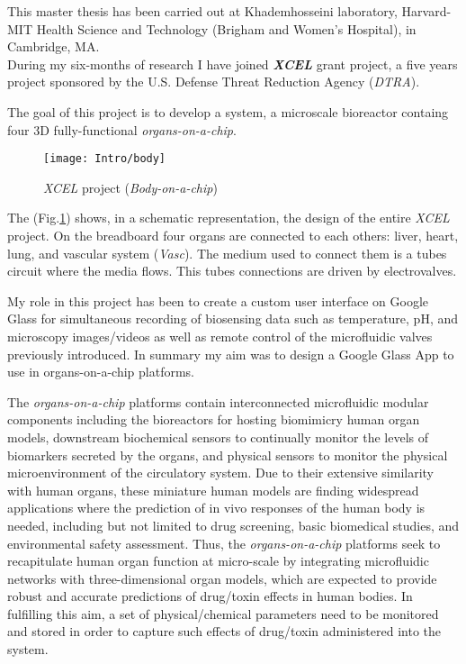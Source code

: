 This master thesis has been carried out at Khademhosseini laboratory, Harvard-MIT Health Science and Technology (Brigham and Women's Hospital), in Cambridge, MA.\\
During my six-months of research I have joined \textit{\textbf{XCEL}} grant project, a five years project sponsored by the U.S. Defense Threat Reduction Agency (\textit{DTRA}).

The goal of this project is to develop a system, a microscale bioreactor containg four 3D fully-functional \textit{organs-on-a-chip}.

\begin{figure}[h]
	\centering
	\texttt{[image: Intro/body]}
	\caption{\textit{XCEL} project (\textit{Body-on-a-chip})}
	\label{Fig:Body}
	
\end{figure}

The (Fig.\ref{Fig:Body}) shows, in a schematic representation, the design of the entire \textit{XCEL} project. On the breadboard four organs are connected to each others: liver, heart, lung, and vascular system (\textit{Vasc}). The medium used to connect them is a tubes circuit where the media flows. This tubes connections are driven by electrovalves.


My role in this project has been to create a custom user interface on Google Glass for simultaneous recording of biosensing data such as temperature, pH, and microscopy images/videos as well as remote control of the microfluidic valves previously introduced. In summary my aim was to design a Google Glass App to use in organs-on-a-chip platforms.

The \textit{organs-on-a-chip} platforms contain interconnected microfluidic modular components including the bioreactors for hosting biomimicry human organ models, downstream biochemical sensors to continually monitor the levels of biomarkers secreted by the organs, and physical sensors to monitor the physical microenvironment of the circulatory system. Due to their extensive similarity with human organs, these miniature human models are finding widespread applications where the prediction of in vivo responses of the human body is needed, including but not limited to drug screening, basic biomedical studies, and environmental safety assessment. Thus, the \textit{organs-on-a-chip} platforms seek to recapitulate human organ function at micro-scale by integrating microfluidic networks with three-dimensional organ models, which are expected to provide robust and accurate predictions of drug/toxin effects in human bodies. In fulfilling this aim, a set of physical/chemical parameters need to be monitored and stored in order to capture such effects of drug/toxin administered into the system.\\

